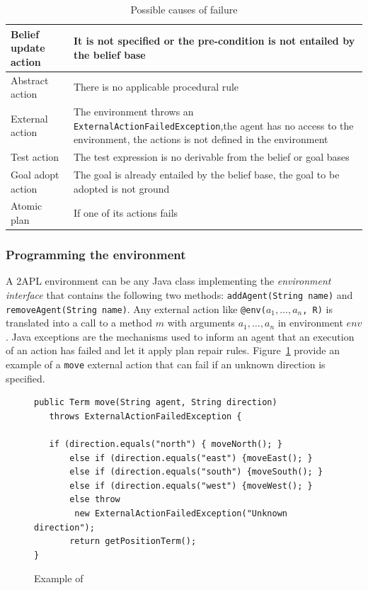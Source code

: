 \documentclass[a4paper]{article}
\begin{document}
\begin{table}[htp]
  \begin{tabular}{|l| p{8.5cm}|}
  \hline
  Belief update action & It is not specified or the pre-condition is not entailed by the belief base  \\
  \hline
  Abstract action & There is no applicable procedural rule \\
  \hline
  External action & The environment throws an \texttt{ExternalActionFailedException},the agent has no access to the environment, the actions is not defined in the environment \\
  \hline
  Test action & The test expression is no derivable from the belief or goal bases \\
  \hline
  Goal adopt action & The goal is already entailed by the belief base, the goal to be adopted is not ground\\
  \hline
  Atomic plan & If one of its actions fails \\
  \hline
  \end{tabular}
  \caption{Possible causes of failure}
  \label{table:action_fail}
\end{table}

\subsubsection{Programming the environment} %

A 2APL environment can be any Java class implementing the \emph{environment interface} that contains the following two methods: \texttt{addAgent(String name)} and \texttt{removeAgent(String name)}. Any external action like \texttt{@env($a_1, \ldots, a_n$, R)} is translated into a call to a method $m$ with arguments $a_1, \ldots, a_n$ in environment $env$. Java exceptions are the mechanisms used to inform an agent that an execution of an action has failed and let it apply plan repair rules. Figure~\ref{fig:example_env} provide an example of a \texttt{move} external action that can fail if an unknown direction is specified.

\begin{figure}[htp]
\begin{verbatim}
public Term move(String agent, String direction)
   throws ExternalActionFailedException {
  	   
   if (direction.equals("north") { moveNorth(); }
   	   else if (direction.equals("east") {moveEast(); }
   	   else if (direction.equals("south") {moveSouth(); }
   	   else if (direction.equals("west") {moveWest(); }
   	   else throw
        new ExternalActionFailedException("Unknown direction");
   	   return getPositionTerm();
}
\end{verbatim}
\caption{Example of}
\label{fig:example_env}
\end{figure}
\end{document}
